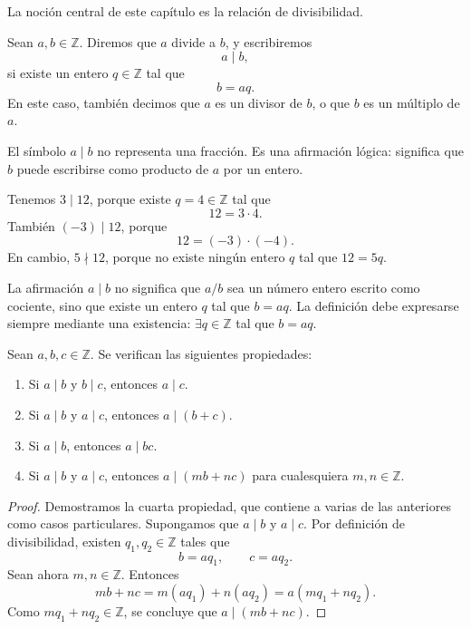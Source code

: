 La noción central de este capítulo es la relación de divisibilidad.

\begin{definicion}[Divisibilidad]
Sean \(a,b\in\mathbb{Z}\). Diremos que \(a\) divide a \(b\), y escribiremos
\[
a\mid b,
\]
si existe un entero \(q\in\mathbb{Z}\) tal que
\[
b=aq.
\]
En este caso, también decimos que \(a\) es un divisor de \(b\), o que \(b\) es un múltiplo de \(a\).
\end{definicion}

El símbolo \(a\mid b\) no representa una fracción. Es una afirmación lógica: significa que \(b\) puede escribirse como producto de \(a\) por un entero.

\begin{ejemplo}
Tenemos \(3\mid 12\), porque existe \(q=4\in\mathbb{Z}\) tal que
\[
12=3\cdot 4.
\]
También \((-3)\mid 12\), porque
\[
12=(-3)\cdot(-4).
\]
En cambio, \(5\nmid 12\), porque no existe ningún entero \(q\) tal que \(12=5q\).
\end{ejemplo}

\begin{advertencia}
La afirmación \(a\mid b\) no significa que \(a/b\) sea un número entero escrito como cociente, sino que existe un entero \(q\) tal que \(b=aq\). La definición debe expresarse siempre mediante una existencia: \(\exists q\in\mathbb{Z}\) tal que \(b=aq\).
\end{advertencia}

\begin{proposicion}
Sean \(a,b,c\in\mathbb{Z}\). Se verifican las siguientes propiedades:
\begin{enumerate}
  \item Si \(a\mid b\) y \(b\mid c\), entonces \(a\mid c\).
  \item Si \(a\mid b\) y \(a\mid c\), entonces \(a\mid (b+c)\).
  \item Si \(a\mid b\), entonces \(a\mid bc\).
  \item Si \(a\mid b\) y \(a\mid c\), entonces \(a\mid (mb+nc)\) para cualesquiera \(m,n\in\mathbb{Z}\).
\end{enumerate}
\end{proposicion}

\begin{proof}
Demostramos la cuarta propiedad, que contiene a varias de las anteriores como casos particulares. Supongamos que \(a\mid b\) y \(a\mid c\). Por definición de divisibilidad, existen \(q_1,q_2\in\mathbb{Z}\) tales que
\[
b=aq_1,
\qquad
c=aq_2.
\]
Sean ahora \(m,n\in\mathbb{Z}\). Entonces
\[
mb+nc=m(aq_1)+n(aq_2)=a(mq_1+nq_2).
\]
Como \(mq_1+nq_2\in\mathbb{Z}\), se concluye que \(a\mid (mb+nc)\).
\end{proof}

